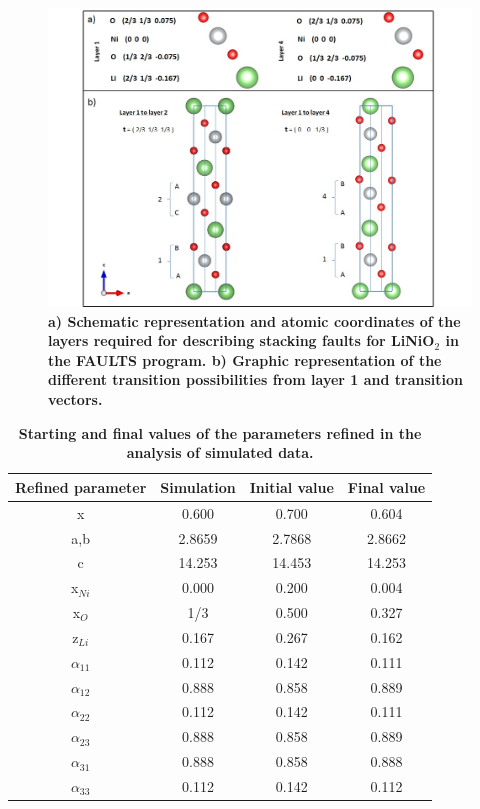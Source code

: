 \begin{figure}
\begin{center}
\includegraphics [width=6in]{description.jpg}
\caption{\bf  a) Schematic representation and atomic coordinates of the layers required for describing stacking faults for LiNiO$_2$ in the FAULTS program. b) Graphic representation of the different transition possibilities from layer 1 and transition vectors.}
\label{esquemacapes}
\end{center}
\end{figure}


\begin{table}
\begin{center}
\begin{tabular}{|c|c|c|c|}
\hline
Refined parameter & Simulation & Initial value & Final value \\
\hline
x & 0.600 & 0.700 & 0.604 \\
\hline
a,b & 2.8659 & 2.7868 & 2.8662 \\
\hline
c & 14.253 & 14.453 & 14.253 \\
\hline
x$_{Ni}$ & 0.000 & 0.200 & 0.004 \\
\hline
x$_{O}$ & 1/3 & 0.500 & 0.327 \\
\hline
z$_{Li}$ & 0.167	&0.267&	0.162 \\
\hline
$\alpha_{11}$ & 0.112&	0.142	&0.111\\
\hline
$\alpha_{12}$ & 0.888	&0.858&	0.889 \\
\hline
$\alpha_{22}$ & 0.112&	0.142	&0.111\\
\hline
$\alpha_{23}$ & 0.888	&0.858	&0.889 \\
\hline
$\alpha_{31}$ & 0.888&	0.858&	0.888 \\
\hline
$\alpha_{33}$ & 0.112&	0.142&	0.112\\
\hline

\end{tabular}
\caption{\textbf{Starting and final values of the parameters refined in the analysis of simulated data.}}
\label{taulasim}
\end{center}
\end{table}

